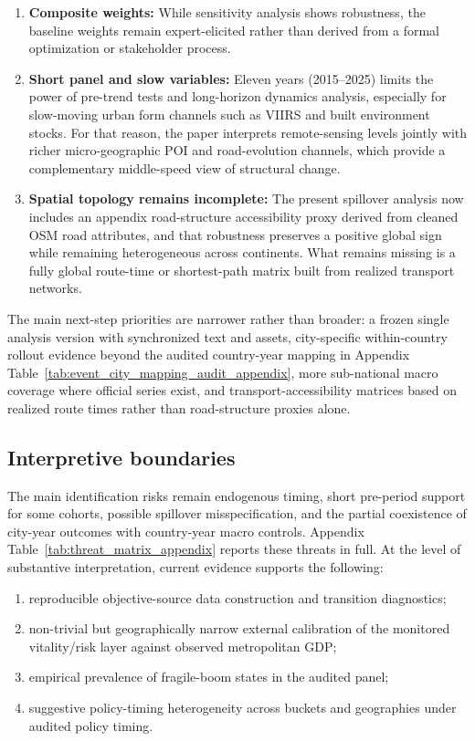 \documentclass[11pt,a4paper]{article}
\begin{document}
\begin{enumerate}
  \item \textbf{Composite weights:} While sensitivity analysis shows robustness, the baseline weights remain expert-elicited rather than derived from a formal optimization or stakeholder process.
  \item \textbf{Short panel and slow variables:} Eleven years (2015--2025) limits the power of pre-trend tests and long-horizon dynamics analysis, especially for slow-moving urban form channels such as VIIRS and built environment stocks. For that reason, the paper interprets remote-sensing levels jointly with richer micro-geographic POI and road-evolution channels, which provide a complementary middle-speed view of structural change.
  \item \textbf{Spatial topology remains incomplete:} The present spillover analysis now includes an appendix road-structure accessibility proxy derived from cleaned OSM road attributes, and that robustness preserves a positive global sign while remaining heterogeneous across continents. What remains missing is a fully global route-time or shortest-path matrix built from realized transport networks.
\end{enumerate}

The main next-step priorities are narrower rather than broader: a frozen single analysis version with synchronized text and assets, city-specific within-country rollout evidence beyond the audited country-year mapping in Appendix Table~\ref{tab:event_city_mapping_audit_appendix}, more sub-national macro coverage where official series exist, and transport-accessibility matrices based on realized route times rather than road-structure proxies alone.

\subsection{Interpretive boundaries}
The main identification risks remain endogenous timing, short pre-period support for some cohorts, possible spillover misspecification, and the partial coexistence of city-year outcomes with country-year macro controls.
Appendix Table~\ref{tab:threat_matrix_appendix} reports these threats in full.
At the level of substantive interpretation, current evidence supports the following:
\begin{enumerate}
  \item reproducible objective-source data construction and transition diagnostics;
  \item non-trivial but geographically narrow external calibration of the monitored vitality/risk layer against observed metropolitan GDP;
  \item empirical prevalence of fragile-boom states in the audited panel;
  \item suggestive policy-timing heterogeneity across buckets and geographies under audited policy timing.
\end{enumerate}
\end{document}
